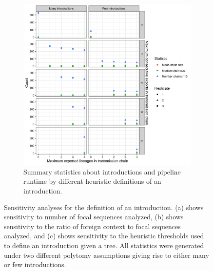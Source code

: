 \documentclass[9pt,twoside,lineno]{pnas-new}
\begin{document}
\begin{figure}[h!]
\begin{subfigure}[b]{0.9\textwidth}
\centering
\includegraphics[width = 11.4cm]{figures/fig_SX_sensitivity_chain_defn.png}
\caption{Summary statistics about introductions and pipeline runtime by different heuristic definitions of an introduction.}  
\end{subfigure}
\caption{Sensitivity analyses for the definition of an introduction. (a) shows sensitivity to number of focal sequences analyzed, (b) shows sensitivity to the ratio of foreign context to focal sequences analyzed, and (c) shows sensitivity to the heuristic thresholds used to define an introduction given a tree. All statistics were generated under two different polytomy assumptions giving rise to either many or few introductions.}
\label{fig:sensitivity_figs}
\end{figure}
\end{document}
